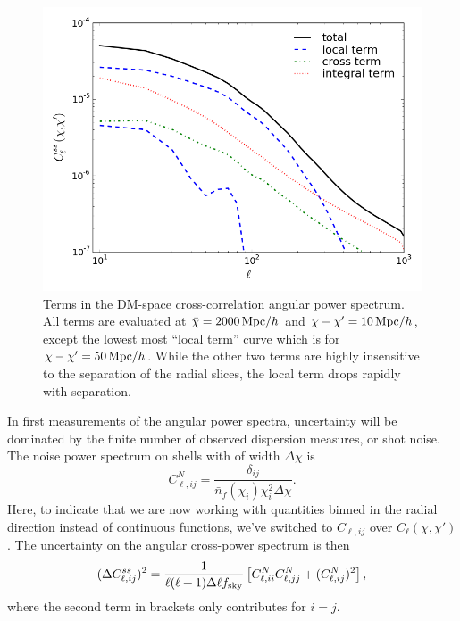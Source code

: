 \documentclass[twocolumn,prl,nofootinbib,floatfix]{revtex4-1}
\begin{document}
\begin{figure}
    \includegraphics[scale=0.42]{figures/terms}
    \caption{
        \label{f:terms}
        Terms in the DM-space cross-correlation angular power spectrum.
        All terms are evaluated at $\bar\chi=2000\,{\rm Mpc}/h$ and 
        $\chi - \chi' = 10\,{\rm Mpc}/h$, except the lowest most 
        ``local term'' curve which is for $\chi - \chi'=50\,{\rm Mpc}/h$. 
        While
        the other two terms are highly insensitive to the separation of
        the radial slices, the local term drops rapidly with separation.
    }
\end{figure}

In first measurements of the angular power spectra, uncertainty will be
dominated by the finite number of observed dispersion measures, or shot noise.
The noise power spectrum on shells with of width
$\Delta \chi$ is
\begin{equation}
    C^N_{\ell, ij} = \frac{\delta_{ij}}{\bar n_f(\chi_i)\chi_i^2\Delta\chi}.
\end{equation}
Here, to indicate that we are now working with quantities binned in the radial
direction instead of
continuous functions, we've switched to $C_{\ell,ij}$ over 
$C_\ell(\chi, \chi')$. The uncertainty on the angular
cross-power spectrum is then
\begin{align}
    (\Delta{C^{ss}_{\ell,ij}})^2 = 
    {\frac{1}{\ell(\ell + 1)\Delta \ell f_{\rm sky}}}
        \left[C^N_{\ell,ii} C^N_{\ell,jj} +  (C^N_{\ell,ij})^2\right],
\end{align}
where the second term in brackets only contributes for $i = j$.
\end{document}
